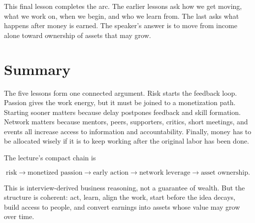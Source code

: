 \begin{figure}
\centering
{}
\end{figure}

This final lesson completes the arc. The earlier lessons ask how we get moving, what we work on, when we begin, and who we learn from. The last asks what happens after money is earned. The speaker's answer is to move from income alone toward ownership of assets that may grow.

\section{Summary}

The five lessons form one connected argument. Risk starts the feedback loop. Passion gives the work energy, but it must be joined to a monetization path. Starting sooner matters because delay postpones feedback and skill formation. Network matters because mentors, peers, supporters, critics, short meetings, and events all increase access to information and accountability. Finally, money has to be allocated wisely if it is to keep working after the original labor has been done.

The lecture's compact chain is

\begin{equation}
\text{risk}
\longrightarrow
\text{monetized passion}
\longrightarrow
\text{early action}
\longrightarrow
\text{network leverage}
\longrightarrow
\text{asset ownership}.
\end{equation}

This is interview-derived business reasoning, not a guarantee of wealth. But the structure is coherent: act, learn, align the work, start before the idea decays, build access to people, and convert earnings into assets whose value may grow over time.
